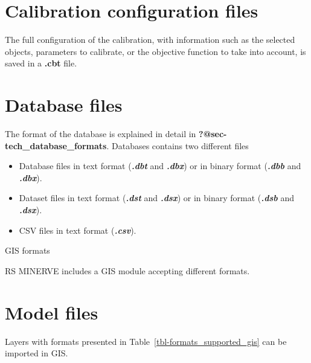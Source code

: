 \documentclass[
  letterpaper,
  DIV=11,
  numbers=noendperiod]{scrreprt}
\begin{document}
\hypertarget{calibration-configuration-files}{%
\chapter{Calibration configuration
files}\label{calibration-configuration-files}}

The full configuration of the calibration, with information such as the
selected objects, parameters to calibrate, or the objective function to
take into account, is saved in a \textbf{.cbt} file.

\hypertarget{database-files}{%
\chapter{Database files}\label{database-files}}

The format of the database is explained in detail in
\textbf{?@sec-tech\_database\_formats}. Databases contains two different
files

\begin{itemize}
\item
  Database files in text format (\textbf{\emph{.dbt}} and
  \textbf{\emph{.dbx}}) or in binary format (\textbf{\emph{.dbb}} and
  \textbf{\emph{.dbx}}).
\item
  Dataset files in text format (\textbf{\emph{.dst}} and
  \textbf{\emph{.dsx}}) or in binary format (\textbf{\emph{.dsb}} and
  \textbf{\emph{.dsx}}).
\item
  CSV files in text format (\textbf{\emph{.csv}}).
\end{itemize}

GIS formats

RS MINERVE includes a GIS module accepting different formats.

\hypertarget{model-files-1}{%
\chapter{Model files}\label{model-files-1}}

Layers with formats presented in Table~\ref{tbl-formats_supported_gis}
can be imported in GIS.
\end{document}
